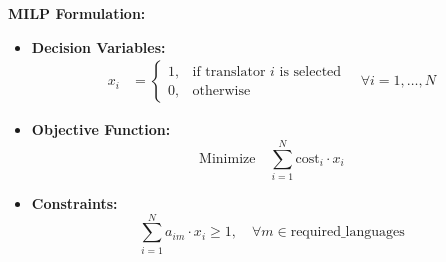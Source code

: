 \documentclass{article}
\begin{document}
\textbf{MILP Formulation:}

\begin{itemize}
    \item \textbf{Decision Variables:}
    \begin{align*}
        x_i & = 
        \begin{cases} 
        1, & \text{if translator $i$ is selected} \\ 
        0, & \text{otherwise}
        \end{cases}
        \quad \forall i = 1, \ldots, N
    \end{align*}

    \item \textbf{Objective Function:}
    \begin{equation*}
        \text{Minimize} \quad \sum_{i=1}^{N} \text{cost}_i \cdot x_i
    \end{equation*}

    \item \textbf{Constraints:}
    \begin{equation*}
        \sum_{i=1}^{N} a_{im} \cdot x_i \geq 1, \quad \forall m \in \text{required\_languages}
    \end{equation*}
\end{itemize}
\end{document}
